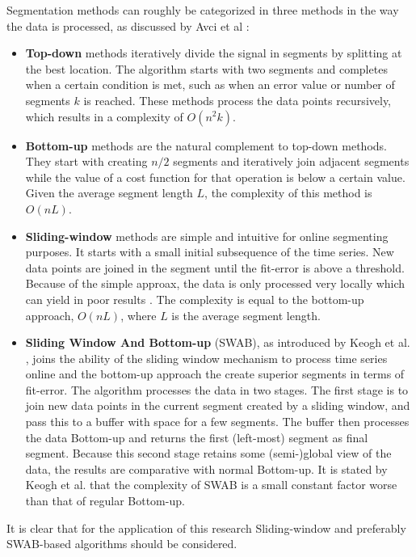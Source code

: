 Segmentation methods can roughly be categorized in three methods in the way the data is processed, as discussed by Avci et al \cite{avci2010activity}:
\begin{itemize}
  \item \textbf{Top-down} methods iteratively divide the signal in segments by splitting at the best location.
  The algorithm starts with two segments and completes when a certain condition is met, such as when an error value or number of segments $k$ is reached.
  These methods process the data points recursively, which results in a complexity of $O(n^2k)$.
  \item \textbf{Bottom-up} methods are the natural complement to top-down methods.
  They start with creating $n/2$ segments and iteratively join adjacent segments while the value of a cost function for that operation is below a certain value.
  Given the average segment length $L$, the complexity of this method is $O(nL)$.
  \item \textbf{Sliding-window} methods are simple and intuitive for online segmenting purposes.
  It starts with a small initial subsequence of the time series.
  New data points are joined in the segment until the fit-error is above a threshold.
  Because of the simple approax, the data is only processed very locally which can yield in poor results \cite{keogh2001online}.
  The complexity is equal to the bottom-up approach, $O(nL)$, where $L$ is the average segment length.
  \item \textbf{Sliding Window And Bottom-up} (SWAB), as introduced by Keogh et al. \cite{keogh2001online}, joins the ability of the sliding window mechanism to process time series online and the bottom-up approach the create superior segments in terms of fit-error.
  The algorithm processes the data in two stages.
  The first stage is to join new data points in the current segment created by a sliding window, and pass this to a buffer with space for a few segments.
  The buffer then processes the data Bottom-up and returns the first (left-most) segment as final segment.
  Because this second stage retains some (semi-)global view of the data, the results are comparative with normal Bottom-up.
  It is stated by Keogh et al. that the complexity of SWAB is a small constant factor worse than that of regular Bottom-up.
\end{itemize}
It is clear that for the application of this research Sliding-window and preferably SWAB-based algorithms should be considered.


